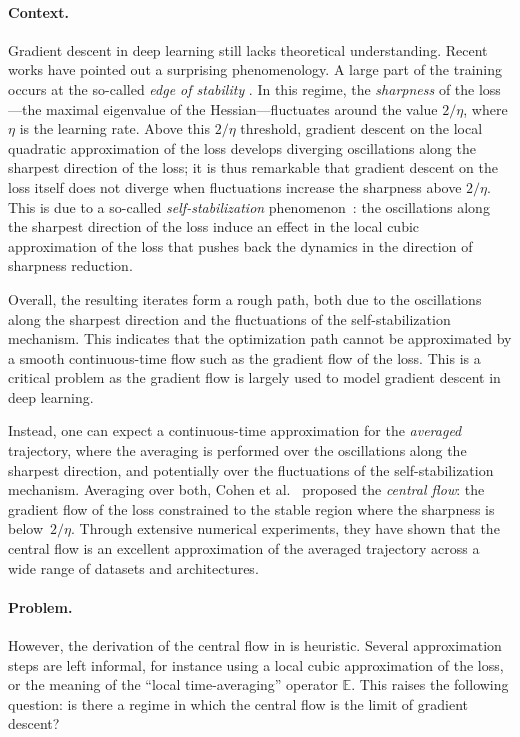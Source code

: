 \documentclass[11pt,english,reqno]{article}
\newcommand{\E}{\mathbb{E}}
\theoremstyle{plain}
\theoremstyle{definition}
\theoremstyle{remark}
\numberwithin{equation}{section}
\begin{document}
\paragraph{Context.} Gradient descent in deep learning still lacks theoretical understanding. Recent works have pointed out a surprising phenomenology. A large part of the training occurs at the so-called \emph{edge of stability} \cite{jastrzkebski2018relation,jastrzebski2020break,cohen2021gradient}. In this regime, the \emph{sharpness} of the loss---the maximal eigenvalue of the Hessian---fluctuates around the value $2/\eta$, where $\eta$ is the learning rate. Above this $2/\eta$ threshold, gradient descent on the local quadratic approximation of the loss develops diverging oscillations along the sharpest direction of the loss; it is thus remarkable that gradient descent on the loss itself does not diverge when fluctuations increase the sharpness above $2/\eta$. This is due to a so-called \emph{self-stabilization} phenomenon~\cite{damian2022self}: 
the oscillations along the sharpest direction of the loss induce an effect in the local cubic approximation of the loss that pushes back the dynamics in the direction of sharpness reduction. 

Overall, the resulting iterates form a rough path, both due to the oscillations along the sharpest direction and the fluctuations of the self-stabilization mechanism. This indicates that the optimization path cannot be approximated by a smooth continuous-time flow such as the gradient flow of the loss. This is a critical problem as the gradient flow is largely used to model gradient descent in deep learning. 

Instead, one can expect a continuous-time approximation for the \emph{averaged} trajectory, where the averaging is performed over the oscillations along the sharpest direction, and potentially over the fluctuations of the self-stabilization mechanism. Averaging over both, Cohen et al.~\cite{cohen2024understanding} proposed the \emph{central flow}: the gradient flow of the loss constrained to the stable region where the sharpness is below~$2/\eta$. Through extensive numerical experiments, they have shown that the central flow is an excellent approximation of the averaged trajectory across a wide range of datasets and architectures. 

\paragraph{Problem.} However, the derivation of the central flow in \cite{cohen2024understanding} is heuristic. Several approximation steps are left informal, for instance using a local cubic approximation of the loss, or the meaning of the ``local time-averaging'' operator $\E$. This raises the following question: is there a regime in which the central flow is the limit of gradient descent? 
\end{document}
